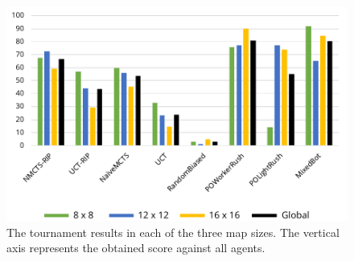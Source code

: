 \documentclass[conference]{IEEEtran}
\begin{document}
\begin{figure}[!t]
\begin{center}
	\includegraphics[width=1\columnwidth]{figs/TR.pdf}
	\caption{The tournament results in each of the three map sizes. The vertical axis represents the obtained score against all agents.}
	\label{TournamentResultsAllMaps}
\end{center}
\end{figure}
\end{document}
